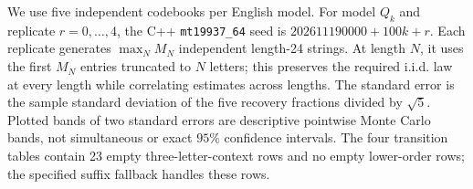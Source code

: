 We use five independent codebooks per English model. For model $Q_k$ and replicate $r=0,\ldots,4$, the C++ \texttt{mt19937\_64} seed is $202611190000+100k+r$. Each replicate generates $\max_N M_N$ independent length-24 strings. At length $N$, it uses the first $M_N$ entries truncated to $N$ letters; this preserves the required i.i.d. law at every length while correlating estimates across lengths. The standard error is the sample standard deviation of the five recovery fractions divided by $\sqrt5$. Plotted bands of two standard errors are descriptive pointwise Monte Carlo bands, not simultaneous or exact $95\%$ confidence intervals. The four transition tables contain 23 empty three-letter-context rows and no empty lower-order rows; the specified suffix fallback handles these rows.
